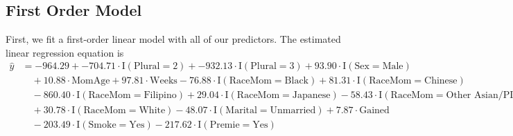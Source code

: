 \documentclass{article}\usepackage[]{graphicx}\usepackage[]{xcolor}
\begin{document}
\subsection{First Order Model}

First, we fit a first-order linear model with all of our predictors. The estimated linear regression equation is \\

\begin{align*} \hat{y} &= -964.29 + -704.71\cdot \text{I}(\text{Plural} = 2) + -932.13\cdot \text{I}(\text{Plural} = 3) + 93.90\cdot \text{I}(\text{Sex} = \text{Male}) \\ &\quad + 10.88\cdot \text{MomAge} + 97.81\cdot \text{Weeks} -76.88\cdot \text{I}(\text{RaceMom} = \text{Black}) + 81.31\cdot \text{I}(\text{RaceMom} = \text{Chinese}) \\ &\quad -860.40\cdot \text{I}(\text{RaceMom} = \text{Filipino}) + 29.04\cdot \text{I}(\text{RaceMom} = \text{Japanese}) -58.43\cdot \text{I}(\text{RaceMom} = \text{Other\ Asian/PI}) \\ &\quad + 30.78\cdot \text{I}(\text{RaceMom} = \text{White}) -48.07\cdot \text{I}(\text{Marital} = \text{Unmarried}) + 7.87\cdot \text{Gained} \\ &\quad -203.49\cdot \text{I}(\text{Smoke} = \text{Yes}) -217.62\cdot \text{I}(\text{Premie} = \text{Yes}) \end{align*}
  
\end{document}
